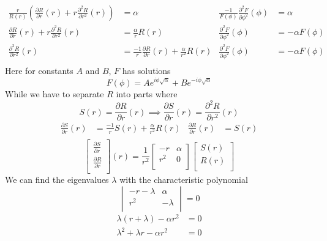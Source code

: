 \documentclass{article}
\begin{document}
\begin{solution}
\begin{align*}
\frac{r}{R(r)} \left( \frac{\partial R}{\partial r}(r) + r \frac{\partial^{2} R}{\partial r^{2}}(r) \right) &= \alpha
&
\frac{-1}{F(\phi)} \frac{\partial^{2} F}{\partial \phi^{2}}(\phi) &= \alpha\\
\frac{\partial R}{\partial r}(r) + r \frac{\partial^{2} R}{\partial r^{2}}(r) &= \frac{\alpha}{r} R(r)
&
\frac{\partial^{2} F}{\partial \phi^{2}}(\phi) &= -\alpha F(\phi)\\
\frac{\partial^{2} R}{\partial r^{2}}(r) &= \frac{-1}{r} \frac{\partial R}{\partial r}(r) + \frac{\alpha}{r^{2}} R(r)
&
\frac{\partial^{2} F}{\partial \phi^{2}}(\phi) &= -\alpha F(\phi)\\
\end{align*}
Here for constants $A$ and $B$, $F$ has solutions
\[ F(\phi)= Ae^{i\phi\sqrt{\alpha}} + Be^{-i\phi\sqrt{\alpha}} \]
While we have to separate $R$ into parts where
\[ S(r) = \frac{\partial R}{\partial r} (r) \implies \frac{\partial S}{\partial r} (r) =  \frac{\partial^{2} R}{\partial r^{2}} (r) \]
\begin{align*}
\frac{\partial S}{\partial r}(r) &= \frac{-1}{r} S(r) + \frac{\alpha}{r^{2}} R(r)
&
\frac{\partial R}{\partial r} (r) &= S(r)\\
\end{align*}
\[
\begin{bmatrix}
\frac{\partial S}{\partial r} \\
\frac{\partial R}{\partial r} \\
\end{bmatrix}
(r) = 
\frac{1}{r^{2}}
\begin{bmatrix}
-r	&	\alpha	\\
r^{2}	&	0	\\
\end{bmatrix}
\begin{bmatrix}
S(r)	\\
R(r)	\\
\end{bmatrix}
\]
We can find the eigenvalues $\lambda$ with the characteristic polynomial
\[ \begin{vmatrix}
-r - \lambda	&	\alpha		\\
r^{2}			&	-\lambda	\\
\end{vmatrix} = 0 \]
\begin{align*}
\lambda(r + \lambda) - \alpha r^{2} &= 0\\
\lambda^{2} + \lambda r - \alpha r^{2} &= 0\\

\end{align*}
\end{solution}
\end{document}
